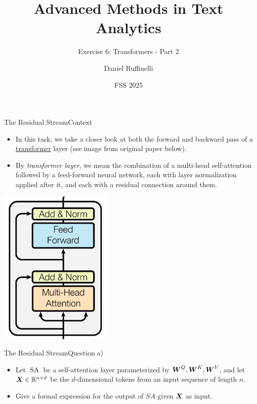 \documentclass[t]{beamer}
\title[Write your short title here]{Advanced Methods in Text Analytics}
\subtitle{Exercise 6: Transformers - Part 2}
\author{Daniel Ruffinelli}
\institute{University of Mannheim}
\date{FSS 2025}
\newcommand\op[1]{\operatorname{#1}}
\begin{document}

\begin{frame}
    \titlepage{}
\end{frame}

\begin{frame}{The Residual Stream}{Context}
    \begin{itemize}
        \item In this task, we take a closer look at both the forward and
              backward pass of a
              \href{https://arxiv.org/pdf/1706.03762}{\underline{transformer}}
              layer (see image from original paper below).
        \item By \emph{transformer layer}, we mean the combination of a
              multi-head self-attention followed by a feed-forward neural
              network, each with layer normalization applied after it, and each
              with a residual connection around them.
    \end{itemize}
    \begin{center}
        \includegraphics[scale=0.4]{img/transformer_layer.png}
    \end{center}
\end{frame}

\begin{frame}{The Residual Stream}{Question a)}
    \begin{itemize}
        \item Let $\op{SA}$ be a self-attention layer parameterized by
              ${\boldsymbol{W}}^Q,{\boldsymbol{W}}^K,{\boldsymbol{W}}^V$, and let ${\boldsymbol{X}}\in \mathbb{R}^{n\times d}$ be the
              $d$-dimensional tokens from an input sequence of length $n$.
        \item Give a formal expression for the output of $SA$ given ${\boldsymbol{X}}$ as
              input.
    \end{itemize}
\end{frame}
\end{document}
